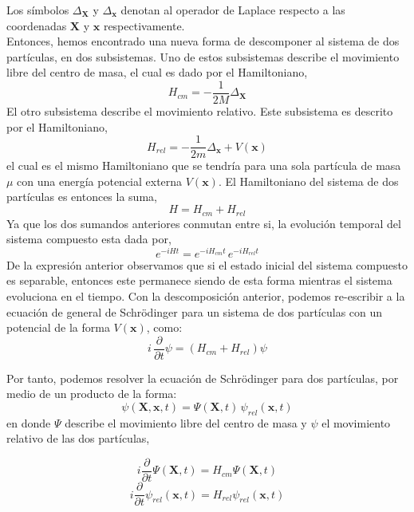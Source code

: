 \documentclass[12pt]{book}
\numberwithin{equation}{chapter}
\def\x{\mathbf{x}}
\def\xx{\mathbf{X}}
\begin{document}
Los s\'imbolos $\Delta_{\xx}$ y $\Delta_{\x}$ denotan al operador de Laplace respecto a las coordenadas $\xx$ y $\x$ respectivamente.\\ 

Entonces, hemos encontrado una nueva forma de descomponer al sistema de dos part\'iculas, en dos subsistemas. Uno de estos subsistemas describe el movimiento libre del centro de masa, el cual es dado por el Hamiltoniano,
\begin{equation}
H_{cm}= - \frac{1}{2M} \Delta_{\xx} 
\end{equation}
El otro subsistema describe el movimiento relativo. Este subsistema es descrito por el Hamiltoniano,
\begin{equation}
H_{rel}= - \frac{1}{2 m} \Delta_{\x} + V(\x)
\end{equation}
el cual es el mismo Hamiltoniano que se tendr\'ia para una sola part\'icula de masa $\mu$ con una energ\'ia potencial externa $V(\x)$. El Hamiltoniano del sistema de dos part\'iculas es entonces la suma,
\begin{equation}
H= H_{cm}  + H_{rel}
\end{equation}
Ya que los dos sumandos anteriores conmutan entre si, la evoluci\'on temporal del sistema compuesto esta dada por,
\begin{equation}
e^{-iHt}= e^{-iH_{cm}t} \, e^{-iH_{rel}t}
\end{equation}
De la expresi\'on anterior observamos que si el estado inicial del sistema compuesto es separable, entonces este permanece siendo de esta forma mientras el sistema evoluciona en el tiempo. Con la descomposici\'on anterior, podemos re-escribir a la ecuaci\'on de general de Schr\"odinger para un sistema de dos part\'iculas con un potencial de la forma $V(\x)$, como:
\begin{equation}
i\, \frac{\partial}{\partial t} \psi=(H_{cm}  + H_{rel}) \psi
\end{equation}

Por tanto, podemos resolver la ecuaci\'on de Schr\"odinger para dos part\'iculas, por medio de un producto de la forma:
\begin{equation}\label{sol-p2}
\psi(\xx,\x,t)= \Psi(\xx , t) \, \psi_{rel} (\x ,t)
\end{equation}
en donde $\Psi$ describe el movimiento libre del centro de masa y $\psi$ el movimiento relativo de las dos part\'iculas,

\begin{equation}\label{sch-cm}
i \frac{\partial}{\partial t} \Psi(\xx , t)= H_{cm}\Psi(\xx , t)
\end{equation}
\begin{equation}\label{sch-rel}
i \frac{\partial}{\partial t} \psi_{rel}(\x,t)= H_{rel} \psi_{rel}(\x ,t)
\end{equation}
\end{document}
